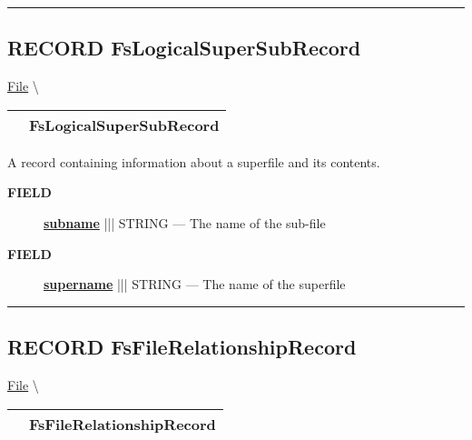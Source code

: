 \rule{\linewidth}{0.5pt}
\subsection*{\textsf{\colorbox{headtoc}{\color{white} RECORD}
FsLogicalSuperSubRecord}}

\hypertarget{ecldoc:file.fslogicalsupersubrecord}{}
\hspace{0pt} \hyperlink{ecldoc:File}{File} \textbackslash 

{\renewcommand{\arraystretch}{1.5}
\begin{tabularx}{\textwidth}{|>{\raggedright\arraybackslash}l|X|}
\hline
\hspace{0pt}\mytexttt{\color{red} } & \textbf{FsLogicalSuperSubRecord} \\
\hline
\end{tabularx}
}

\par





A record containing information about a superfile and its contents.







\par
\begin{description}
\item [\colorbox{tagtype}{\color{white} \textbf{\textsf{FIELD}}}] \textbf{\underline{subname}} ||| STRING --- The name of the sub-file
\item [\colorbox{tagtype}{\color{white} \textbf{\textsf{FIELD}}}] \textbf{\underline{supername}} ||| STRING --- The name of the superfile
\end{description}





\rule{\linewidth}{0.5pt}
\subsection*{\textsf{\colorbox{headtoc}{\color{white} RECORD}
FsFileRelationshipRecord}}

\hypertarget{ecldoc:file.fsfilerelationshiprecord}{}
\hspace{0pt} \hyperlink{ecldoc:File}{File} \textbackslash 

{\renewcommand{\arraystretch}{1.5}
\begin{tabularx}{\textwidth}{|>{\raggedright\arraybackslash}l|X|}
\hline
\hspace{0pt}\mytexttt{\color{red} } & \textbf{FsFileRelationshipRecord} \\
\hline
\end{tabularx}
}

